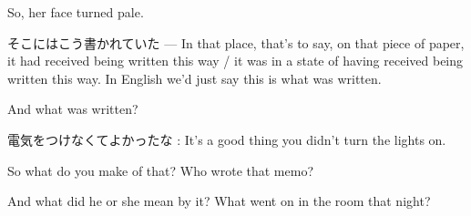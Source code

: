 So, her face turned pale.

そこにはこう書かれていた --- In that place, that's to say, on that piece of paper, it had received being written this way / it was in a state of having received being written this way. In English we'd just say this is what was written.

And what was written?

電気をつけなくてよかったな : It's a good thing you didn't turn the lights on.

{}

So what do you make of that? Who wrote that memo?

And what did he or she mean by it? What went on in the room that night?

\stopsectionlevel
